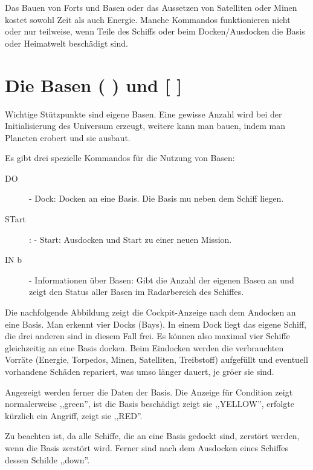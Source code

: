 Das Bauen von Forts und Basen oder das Aussetzen von Satelliten oder Minen
kostet sowohl Zeit als auch Energie. Manche Kommandos funktionieren nicht oder
nur teilweise, wenn Teile des Schiffs oder beim Docken/Ausdocken die Basis
oder Heimatwelt besch\"adigt sind.


\section{Die Basen ( ) und [ ]}

Wichtige St\"utzpunkte sind eigene Basen. Eine gewisse Anzahl wird
bei der Initialisierung des Universum erzeugt, weitere kann man bauen,
indem man Planeten erobert und sie ausbaut.

Es gibt drei spezielle Kommandos f\"ur die Nutzung von Basen:

\begin{description}
\item [DO] - Dock: Docken an eine Basis. Die Basis mu\3 neben dem Schiff
             liegen.
\item [STart]: - Start: Ausdocken und Start zu einer neuen Mission.
\item [IN b] - Informationen \"uber Basen: Gibt die Anzahl der eigenen
Basen an und zeigt den Status aller Basen im Radarbereich des Schiffes.
\end{description}

Die nachfolgende Abbildung zeigt die Cockpit-Anzeige nach dem Andocken
an eine Basis. Man erkennt vier Docks (Bays). In einem Dock liegt das
eigene Schiff, die drei anderen sind in diesem Fall frei. Es k\"onnen
also maximal vier Schiffe gleichzeitig an eine Basis docken.
Beim Eindocken werden die verbrauchten Vorr\"ate (Energie, Torpedos, Minen,
Satelliten, Treibstoff) aufgef\"ullt und eventuell vorhandene Sch\"aden
repariert, was umso l\"anger dauert, je gr\"o\3er sie sind.

Angezeigt werden ferner die Daten der Basis. Die Anzeige f\"ur Condition
zeigt normalerweise ,,green'', ist die Basis besch\"adigt zeigt sie ,,YELLOW'',
erfolgte k\"urzlich ein Angriff, zeigt sie ,,RED''.

Zu beachten ist, da\3 alle Schiffe, die an eine Basis gedockt sind, zerst\"ort
werden, wenn die Basis zerst\"ort wird. Ferner sind nach dem Ausdocken eines
Schiffes dessen Schilde ,,down''.

\footnotesize

